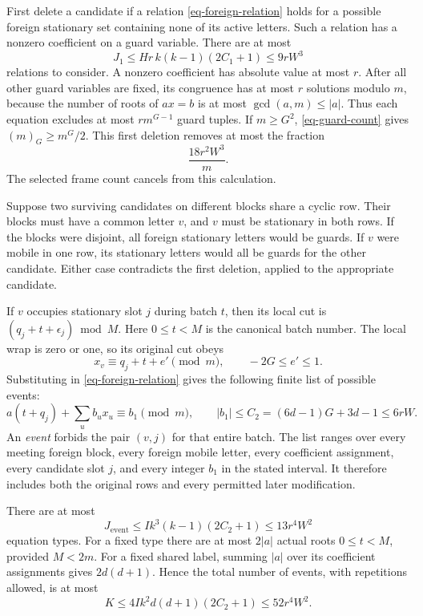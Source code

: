First delete a candidate if a relation \eqref{eq-foreign-relation} holds
for a possible foreign stationary set containing none of its active
letters. Such a relation has a nonzero coefficient on a guard variable.
There are at most
\[
 J_1\le Hr\,k(k-1)(2C_1+1)\le9rW^3
\]
relations to consider. A nonzero coefficient has absolute value at most
$r$. After all other guard variables are fixed, its congruence has at most
$r$ solutions modulo $m$, because the number of roots of $ax=b$ is at most
$\gcd(a,m)\le|a|$. Thus each equation excludes at most $rm^{G-1}$
guard tuples. If $m\ge G^2$, \eqref{eq-guard-count} gives
$(m)_G\ge m^G/2$. This first deletion removes at most the fraction
\begin{equation}\label{eq-guard-loss}
 \frac{18r^2W^3}{m}.
\end{equation}
The selected frame count cancels from this calculation.

Suppose two surviving candidates on different blocks share a cyclic row.
Their blocks must have a common letter $v$, and $v$ must be stationary in
both rows. If the blocks were disjoint, all foreign stationary letters
would be guards. If $v$ were mobile in one row, its stationary letters
would all be guards for the other candidate. Either case contradicts the
first deletion, applied to the appropriate candidate.

If $v$ occupies stationary slot $j$ during batch $t$, then its local cut
is $(q_j+t+\epsilon_j)\bmod M$. Here $0\le t<M$ is the canonical
batch number. The local wrap is zero or one, so its original cut obeys
\[
 x_v\equiv q_j+t+e'\pmod m,\qquad -2G\le e'\le1.
\]
Substituting in \eqref{eq-foreign-relation} gives the following finite
list of possible events:
\begin{equation}\label{eq-event}
 a(t+q_j)+\sum_u b_ux_u\equiv b_1\pmod m,
 \qquad |b_1|\le C_2=(6d-1)G+3d-1\le6rW.
\end{equation}
An \emph{event} forbids the pair $(v,j)$ for that entire batch.
The list ranges over every meeting foreign block, every foreign mobile
letter, every coefficient assignment, every candidate slot $j$, and every
integer $b_1$ in the stated interval. It therefore includes both the
original rows and every permitted later modification.

There are at most
\[
 J_{\mathrm{event}}\le I k^3(k-1)(2C_2+1)\le13r^4W^2
\]
equation types. For a fixed type there are at most $2|a|$ actual roots
$0\le t<M$, provided $M<2m$. For a fixed shared label, summing $|a|$
over its coefficient assignments gives $2d(d+1)$. Hence the total number
of events, with repetitions allowed, is at most
\begin{equation}\label{eq-event-count}
 K\le4Ik^2d(d+1)(2C_2+1)\le52r^4W^2.
\end{equation}

